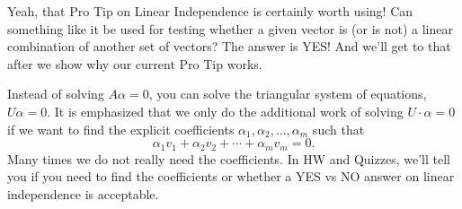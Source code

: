 Yeah, that Pro Tip on Linear Independence is certainly worth using! Can something like it be used for testing whether a given vector is (or is not) a linear combination of another set of vectors? The answer is YES! And we'll get to that after we show why our current Pro Tip works.
\vspace*{.1cm}

\begin{tcolorbox}[title = \textbf{What if you really want to know a set of non-trivial coefficients such that $\mathbf{A \alpha = 0}$ ?}]
 Instead of solving $A \alpha = 0$, you can solve the triangular system of equations, $U \alpha = 0$. It is emphasized that we only do the additional work of solving $U \cdot \alpha=0$ if we want to find the explicit coefficients $\alpha_1, \alpha_2,  \ldots, \alpha_m$ such that 
$$\alpha_1 v_1 + \alpha_2 v_2 + \cdots + \alpha_m v_m =0. $$
Many times we do not really need the coefficients. In HW and Quizzes, we'll tell you if you need to find the coefficients or whether a YES vs NO answer on linear independence is acceptable.
\end{tcolorbox}

